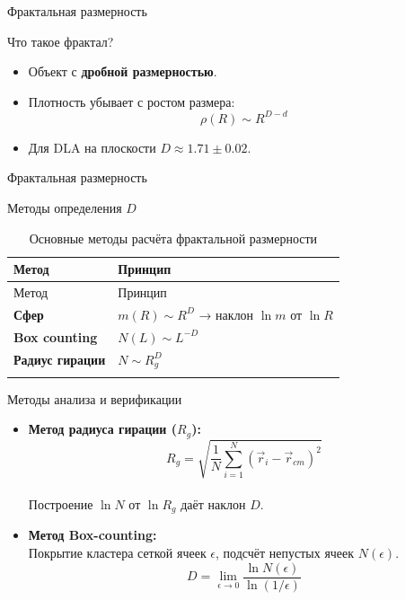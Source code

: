 \documentclass[
  ignorenonframetext,
  aspectratio=169,
  russian,
]{beamer}
\providecommand{\tightlist}{%
  \setlength{\itemsep}{0pt}\setlength{\parskip}{0pt}}
\begin{document}
\begin{frame}{Фрактальная размерность}
\label{ux444ux440ux430ux43aux442ux430ux43bux44cux43dux430ux44f-ux440ux430ux437ux43cux435ux440ux43dux43eux441ux442ux44c}
\begin{block}{Что такое фрактал?}
\label{ux447ux442ux43e-ux442ux430ux43aux43eux435-ux444ux440ux430ux43aux442ux430ux43b}
\begin{itemize}[<+->]
\tightlist
\item
  Объект с \textbf{дробной размерностью}.
\item
  Плотность убывает с ростом размера: \[
  \rho(R) \sim R^{D-d}
  \]
\item
  Для DLA на плоскости \(D \approx 1.71 \pm 0.02\).
\end{itemize}
\end{block}
\end{frame}

\begin{frame}{Фрактальная размерность}
\label{ux444ux440ux430ux43aux442ux430ux43bux44cux43dux430ux44f-ux440ux430ux437ux43cux435ux440ux43dux43eux441ux442ux44c-1}
\begin{block}{Методы определения \(D\)}
\label{ux43cux435ux442ux43eux434ux44b-ux43eux43fux440ux435ux434ux435ux43bux435ux43dux438ux44f-d}
\begin{longtable}[]{@{}ll@{}}
\caption{Основные методы расчёта фрактальной
размерности}\label{tbl-methods}\tabularnewline
\toprule\noalign{}
Метод & Принцип \\
\midrule\noalign{}
\endfirsthead
\toprule\noalign{}
Метод & Принцип \\
\midrule\noalign{}
\endhead
\textbf{Сфер} & \(m(R) \sim R^D\) → наклон \(\ln m\) от \(\ln R\) \\
\textbf{Box counting} & \(N(L) \sim L^{-D}\) \\
\textbf{Радиус гирации} & \(N \sim R_g^D\) \\
\bottomrule\noalign{}
\end{longtable}
\end{block}
\end{frame}

\begin{frame}{Методы анализа и верификации}
\label{ux43cux435ux442ux43eux434ux44b-ux430ux43dux430ux43bux438ux437ux430-ux438-ux432ux435ux440ux438ux444ux438ux43aux430ux446ux438ux438}
\begin{itemize}[<+->]
\item
  \textbf{Метод радиуса гирации (\(R_g\)):}\\
  \[
  R_g = \sqrt{\frac{1}{N} \sum_{i=1}^{N} (\vec{r}_i - \vec{r}_{cm})^2}
  \]\\
  Построение \(\ln N\) от \(\ln R_g\) даёт наклон \(D\).
\item
  \textbf{Метод Box-counting:}\\
  Покрытие кластера сеткой ячеек \(\epsilon\), подсчёт непустых ячеек
  \(N(\epsilon)\).\\
  \[
  D = \lim_{\epsilon \to 0} \frac{\ln N(\epsilon)}{\ln(1/\epsilon)}
  \]
\end{itemize}
\end{frame}
\end{document}
